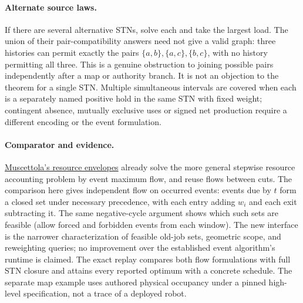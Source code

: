 \documentclass[11pt]{article}
\begin{document}
\paragraph{Alternate source laws.}
If there are several alternative STNs, solve each and take the largest load. The union of their pair-compatibility answers need not give a valid graph: three histories can permit exactly the pairs $\{a,b\},\{a,c\},\{b,c\}$, with no history permitting all three. This is a genuine obstruction to joining possible pairs independently after a map or authority branch. It is not an objection to the theorem for a single STN. Multiple simultaneous intervals are covered when each is a separately named positive hold in the same STN with fixed weight; contingent absence, mutually exclusive uses or signed net production require a different encoding or the event formulation.

\paragraph{Comparator and evidence.}
\href{https://cdn.aaai.org/ICAPS/2004/ICAPS04-032.pdf}{Muscettola's resource envelopes} already solve the more general stepwise resource accounting problem by event maximum flow, and reuse flows between cuts. The comparison here gives independent flow on occurred events: events due by $t$ form a closed set under necessary precedence, with each entry adding $w_i$ and each exit subtracting it. The same negative-cycle argument shows which such sets are feasible (allow forced and forbidden events from each window). The new interface is the narrower characterization of feasible old-job sets, geometric scope, and reweighting queries; no improvement over the established event algorithm's runtime is claimed. The exact replay compares both flow formulations with full STN closure and attains every reported optimum with a concrete schedule. The separate map example uses authored physical occupancy under a pinned high-level specification, not a trace of a deployed robot.
\end{document}
